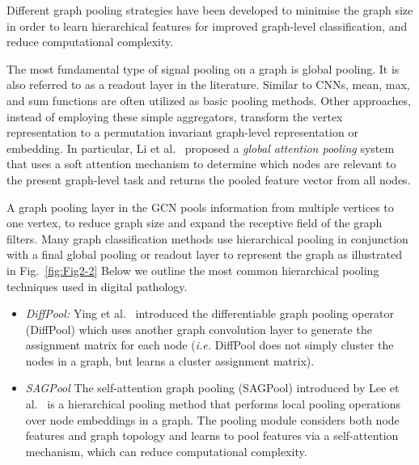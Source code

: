 Different graph pooling strategies have been developed to minimise the graph size in order to learn hierarchical features for improved graph-level classification, and reduce computational complexity.

The most fundamental type of signal pooling on a graph is global pooling. It is also referred to as a readout layer in the literature. Similar to CNNs, mean, max, and sum functions are often utilized as basic pooling methods.
Other approaches, instead of employing these simple aggregators, transform the vertex representation to a permutation invariant graph-level representation or embedding. In particular, Li et al.{~} proposed a \textit{global attention pooling} system that uses a soft attention mechanism to determine which nodes are relevant to the present graph-level task and returns the pooled feature vector from all nodes.

A graph pooling layer in the GCN pools information from multiple vertices to one vertex, to reduce graph size and expand the receptive field of the graph filters. Many graph classification methods use hierarchical pooling in conjunction with a final global pooling or readout layer to represent the graph as illustrated in Fig.{~\ref{fig:Fig2-2}}
Below we outline the most common hierarchical pooling techniques used in digital pathology. 
\begin{itemize}
    \item \textit{DiffPool:} Ying et al.{~} introduced the differentiable graph pooling operator (DiffPool) which uses another graph convolution layer to generate the assignment matrix for each node (\textit{i.e.} DiffPool does not simply cluster the nodes in a graph, but learns a cluster assignment matrix).
    \item \textit{SAGPool} The self-attention graph pooling (SAGPool) introduced by Lee et al.{~} is a hierarchical pooling method that performs local pooling operations over node embeddings in a graph. The pooling module considers both node features and graph topology and learns to pool features via a self-attention mechanism, which can reduce computational complexity.
\end{itemize}
\vspace{-6pt}

